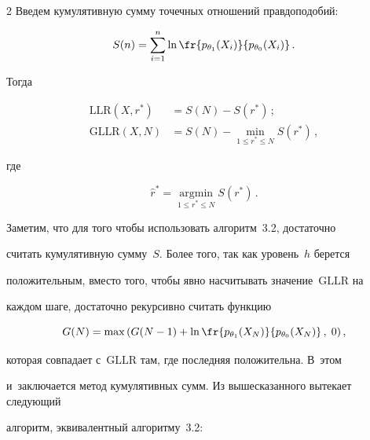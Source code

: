 \begin{multicols}{2}
Введем  кумулятивную сумму точечных отношений правдоподобий:


\begin{equation*}


S(n) = \sum\limits_{i = 1}^n \ln  


\fr{p_{\theta_1}(X_i)}{p_{\theta_0}(X_i)}\,. 


\end{equation*}


Тогда 


\begin{align*}


\mathrm{LLR} (X, r^*) &= S(N) - S(r^*)\,; \\


\mathrm{GLLR}(X, N) &= S(N) - \min\limits_{1  \leqslant r^* \leqslant N  }S(r^*)\,,


\end{align*}


где


$$


\hat{r}^* = \mathop{\mathrm{argmin}}\limits_{1  \leqslant r^* \leqslant N}S(r^*)\,.


$$


Заметим, что для того чтобы использовать алгоритм~3.2, достаточно 


считать кумулятивную сумму~$S$. Более того, так как уровень~$h$ берется 


положительным, вместо того, чтобы явно насчитывать значение~$\mathrm{GLLR}$ на 


каждом шаге, достаточно рекурсивно считать функцию 


\begin{equation*}


 G(N)  =\max\left(G(N- 1) +\ln \fr{p_{\theta_1}(X_N)}{p_{\theta_0}(X_N)}\,, 


\;0\right),


\end{equation*}


которая совпадает с~$\mathrm{GLLR}$ там, где последняя положительна. В~этом 


и~заключается метод кумулятивных сумм. Из вышесказанного вытекает следующий 


алгоритм, эквивалентный алгоритму~3.2:





\smallskip





\noindent



\end{multicols}
